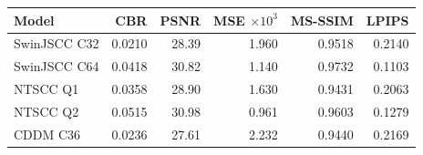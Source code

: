 \begin{tabular}{lrrrrr}
\toprule
Model & CBR & PSNR & MSE $\times10^3$ & MS-SSIM & LPIPS \\
\midrule
SwinJSCC C32 & 0.0210 & 28.39 & 1.960 & 0.9518 & 0.2140 \\
SwinJSCC C64 & 0.0418 & 30.82 & 1.140 & 0.9732 & 0.1103 \\
NTSCC Q1 & 0.0358 & 28.90 & 1.630 & 0.9431 & 0.2063 \\
NTSCC Q2 & 0.0515 & 30.98 & 0.961 & 0.9603 & 0.1279 \\
CDDM C36 & 0.0236 & 27.61 & 2.232 & 0.9440 & 0.2169 \\
\bottomrule
\end{tabular}
